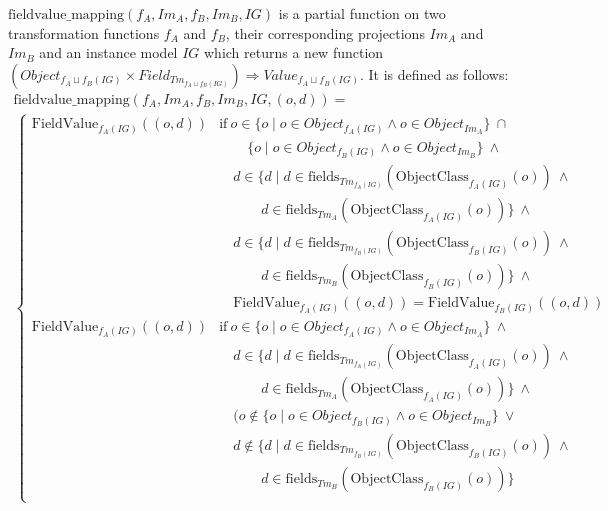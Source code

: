 \begin{defin}
\label{defin:transformation_framework:instance_models_and_instance_graphs:combining_transformation_functions:fieldvalue_mapping}
$\mathrm{fieldvalue\_\!mapping}(f_A, Im_A, f_B, Im_B, IG)$ is a partial function on two transformation functions $f_A$ and $f_B$, their corresponding projections $Im_A$ and $Im_B$ and an instance model $IG$ which returns a new function $(Object_{f_{A} \sqcup f_{B}(IG)} \times Field_{Tm_{f_{A} \sqcup f_{B}(IG)}}) \Rightarrow Value_{f_{A} \sqcup f_{B}(IG)}$. It is defined as follows:
\begin{multline*}
    \mathrm{fieldvalue\_\!mapping}(f_A, Im_A, f_B, Im_B, IG, ( o, d )) = \\
    \begin{cases}
        \mathrm{FieldValue}_{f_{A}(IG)}(( o, d )) & \mathrm{if}\ o \in \{o \mid o \in Object_{f_{A}(IG)} \land o \in Object_{Im_A} \}\ \cap \\&\qquad\{o \mid o \in Object_{f_{B}(IG)} \land o \in Object_{Im_B} \}\ \land\\&\quad d \in \{d \mid d \in \mathrm{fields}_{Tm_{f_{A}(IG)}}(\mathrm{ObjectClass}_{f_{A}(IG)}(o))\ \land \\&\qquad\quad d \in \mathrm{fields}_{Tm_A}(\mathrm{ObjectClass}_{f_{A}(IG)}(o)) \}\ \land\\&\quad d \in \{d \mid d \in \mathrm{fields}_{Tm_{f_{B}(IG)}}(\mathrm{ObjectClass}_{f_{B}(IG)}(o))\ \land \\&\qquad\quad d \in \mathrm{fields}_{Tm_B}(\mathrm{ObjectClass}_{f_{B}(IG)}(o)) \}\ \land\\&\quad \mathrm{FieldValue}_{f_{A}(IG)}(( o, d )) = \mathrm{FieldValue}_{f_{B}(IG)}(( o, d )) \\
        \mathrm{FieldValue}_{f_{A}(IG)}(( o, d )) & \mathrm{if}\ o \in \{o \mid o \in Object_{f_{A}(IG)} \land o \in Object_{Im_A} \}\ \land \\&\quad d \in \{d \mid d \in \mathrm{fields}_{Tm_{f_{A}(IG)}}(\mathrm{ObjectClass}_{f_{A}(IG)}(o))\ \land \\&\qquad\quad d \in \mathrm{fields}_{Tm_A}(\mathrm{ObjectClass}_{f_{A}(IG)}(o)) \}\ \land\\&\quad (o \not\in \{o \mid o \in Object_{f_{B}(IG)} \land o \in Object_{Im_B} \}\ \lor \\&\quad d \not\in \{d \mid d \in \mathrm{fields}_{Tm_{f_{B}(IG)}}(\mathrm{ObjectClass}_{f_{B}(IG)}(o))\ \land \\&\qquad\quad d \in \mathrm{fields}_{Tm_B}(\mathrm{ObjectClass}_{f_{B}(IG)}(o)) \} \\

\end{cases}
\end{multline*}
\end{defin}
